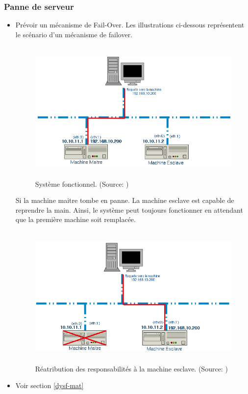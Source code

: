\documentclass[12pt]{article}
\begin{document}
\subsubsection{Panne de serveur}
\justify
\begin{itemize}
	\item Prévoir un mécanisme de Fail-Over. Les illustrations ci-dessous représentent le scénario d'un mécanisme de failover.
	\begin{figure}[H]
	\includegraphics[width=\textwidth,height=200pt]{assets/failover-ok.png} 
	\caption[Failover cas normal]{Système fonctionnel. (Source: \cite{failover})}
	\label{fig:failoverok}
	\end{figure}
	Si la machine maitre tombe en panne. La machine esclave est capable de reprendre la main. Ainsi, le système peut toujours fonctionner en attendant que la première machine soit remplacée.
	\begin{figure}[H]
	\includegraphics[width=\textwidth,height=200pt]{assets/failover-nok.png} 
	\caption[Failover cas dégradé]{Réatribution des responsabilités à la machine esclave. (Source: \cite{failover})}
	\label{fig:failovernok}
	\end{figure}	
	\item Voir section \ref{dysf-mat}
\end{itemize}
\end{document}
